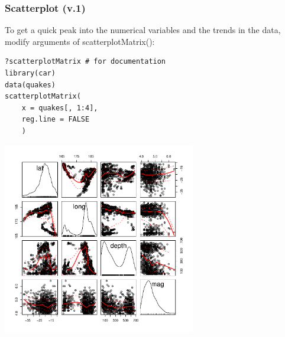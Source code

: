 \begin{frame}
\frametitle{Scatterplot (v.1)}

To get a quick peak into the numerical variables and the trends in the data, modify arguments of \ttfamily scatterplotMatrix(): \normalfont
  		\begin{lstlisting}
?scatterplotMatrix # for documentation
library(car)		
data(quakes)
scatterplotMatrix(
	x = quakes[, 1:4], 
	reg.line = FALSE
	)
		\end{lstlisting}

        \begin{center}
         \includegraphics[width=0.63\textwidth]{images/scatterPlot_v1.pdf}
        \end{center}
\end{frame}


